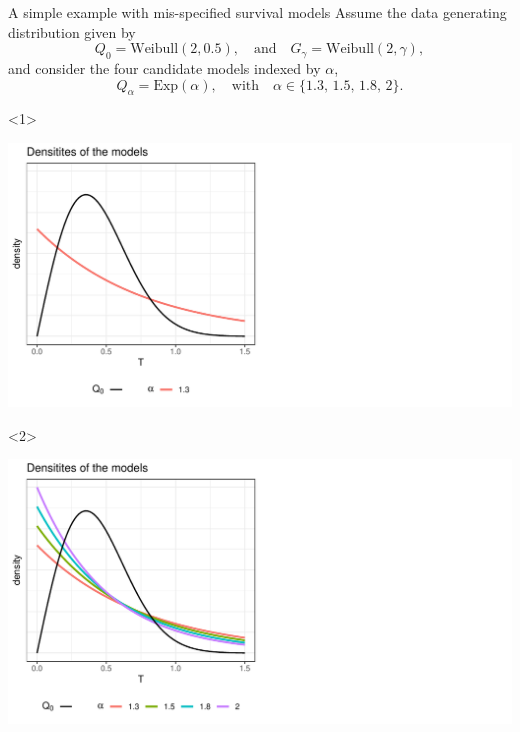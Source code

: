 \documentclass[smaller]{beamer}\usepackage{listings}
\begin{document}
\begin{frame}[label={sec:orgef7fe10}]{A simple example with mis-specified survival models}
\small Assume the data generating distribution given by
\begin{equation*}
  Q_0 = \text{Weibull}(2,  0.5),
  \quad \text{and} \quad
  G_{\gamma} = \text{Weibull}(2,\gamma),
\end{equation*}
and consider the four candidate models indexed by $\alpha$,
\begin{equation*}
  Q_{\alpha} = \text{Exp}(\alpha),
  \quad \text{with} \quad 
  \alpha \in \{1.3, \,1.5,\, 1.8,\, 2\}.
\end{equation*}

\vfill

\begin{onlyenv}<1>
\begin{center}
\includegraphics[width=.9\linewidth]{fig-mix-const-v1.pdf}
\end{center}
\end{onlyenv}

\begin{onlyenv}<2>
\begin{center}
\includegraphics[width=.9\linewidth]{fig-mix-const-v2.pdf}
\end{center}
\end{onlyenv}


\end{frame}
\end{document}
